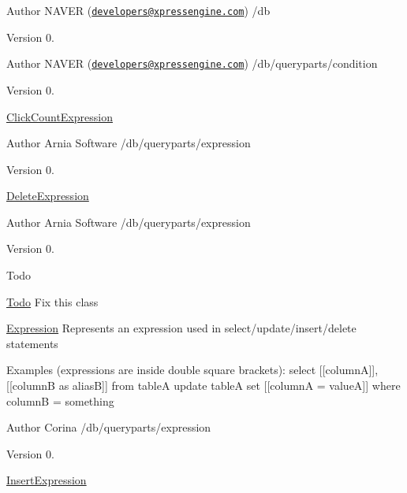 \begin{DoxyAuthor}{Author}
N\+A\+V\+E\+R (\href{mailto:developers@xpressengine.com}{\tt developers@xpressengine.\+com}) /db 
\end{DoxyAuthor}
\begin{DoxyVersion}{Version}
0.
\end{DoxyVersion}
\begin{DoxyAuthor}{Author}
N\+A\+V\+E\+R (\href{mailto:developers@xpressengine.com}{\tt developers@xpressengine.\+com}) /db/queryparts/condition 
\end{DoxyAuthor}
\begin{DoxyVersion}{Version}
0.
\end{DoxyVersion}
\hyperlink{classClickCountExpression}{Click\+Count\+Expression} \begin{DoxyAuthor}{Author}
Arnia Software /db/queryparts/expression 
\end{DoxyAuthor}
\begin{DoxyVersion}{Version}
0.
\end{DoxyVersion}
\hyperlink{classDeleteExpression}{Delete\+Expression}

\begin{DoxyAuthor}{Author}
Arnia Software /db/queryparts/expression 
\end{DoxyAuthor}
\begin{DoxyVersion}{Version}
0. 
\end{DoxyVersion}
\begin{DoxyRefDesc}{Todo}
\item[\hyperlink{todo__todo000003}{Todo}]Fix this class \end{DoxyRefDesc}


\hyperlink{classExpression}{Expression} Represents an expression used in select/update/insert/delete statements

Examples (expressions are inside double square brackets)\+: select \mbox{[}\mbox{[}column\+A\mbox{]}\mbox{]}, \mbox{[}\mbox{[}column\+B as alias\+B\mbox{]}\mbox{]} from table\+A update table\+A set \mbox{[}\mbox{[}column\+A = value\+A\mbox{]}\mbox{]} where column\+B = something

\begin{DoxyAuthor}{Author}
Corina /db/queryparts/expression 
\end{DoxyAuthor}
\begin{DoxyVersion}{Version}
0.
\end{DoxyVersion}
\hyperlink{classInsertExpression}{Insert\+Expression}

